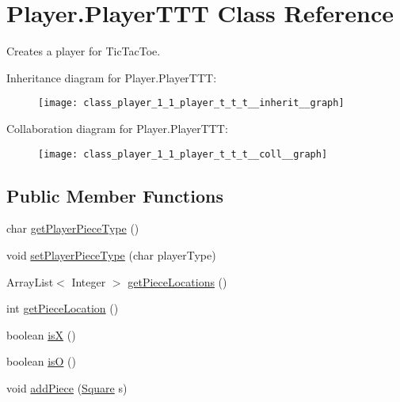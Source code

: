\hypertarget{class_player_1_1_player_t_t_t}{}\section{Player.\+Player\+T\+T\+T Class Reference}
\label{class_player_1_1_player_t_t_t}


Creates a player for Tic\+Tac\+Toe.  




Inheritance diagram for Player.\+Player\+T\+T\+T\+:\nopagebreak
\begin{figure}[H]
\begin{center}
\leavevmode
\texttt{[image: class\_player\_1\_1\_player\_t\_t\_t\_\_inherit\_\_graph]}
\end{center}
\end{figure}


Collaboration diagram for Player.\+Player\+T\+T\+T\+:\nopagebreak
\begin{figure}[H]
\begin{center}
\leavevmode
\texttt{[image: class\_player\_1\_1\_player\_t\_t\_t\_\_coll\_\_graph]}
\end{center}
\end{figure}
\subsection*{Public Member Functions}
\begin{DoxyCompactItemize}
\item 
char \hyperlink{class_player_1_1_player_t_t_t_ab8b6942da0005040404d3ac02c71e463}{get\+Player\+Piece\+Type} ()
\item 
void \hyperlink{class_player_1_1_player_t_t_t_ae624b6b5a46f011a667e0562ad150091}{set\+Player\+Piece\+Type} (char player\+Type)
\item 
Array\+List$<$ Integer $>$ \hyperlink{class_player_1_1_player_t_t_t_a491c3a16684131362d6808e4827d566e}{get\+Piece\+Locations} ()
\item 
int \hyperlink{class_player_1_1_player_t_t_t_aee939d68fa0f319d0e6101a9373e7c7e}{get\+Piece\+Location} ()
\item 
boolean \hyperlink{class_player_1_1_player_t_t_t_ace718e5b67209360615144048fd1814a}{is\+X} ()
\item 
boolean \hyperlink{class_player_1_1_player_t_t_t_ac3f8f41bc0b24865c80283d5a84be6d4}{is\+O} ()
\item 
void \hyperlink{class_player_1_1_player_t_t_t_ab3d884c71bcd92b42bea5a413caa95e8}{add\+Piece} (\hyperlink{class_square_1_1_square}{Square} s)
\end{DoxyCompactItemize}
